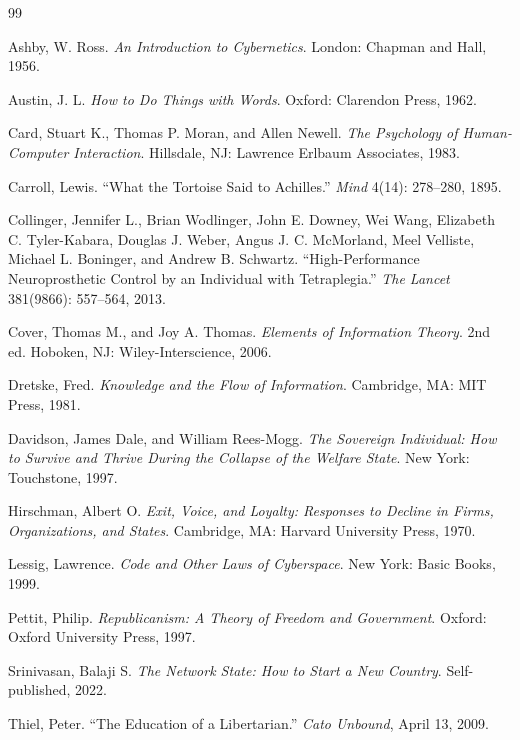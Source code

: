 \documentclass[11pt,twoside,openany]{book}
\theoremstyle{definition}
\theoremstyle{remark}
\begin{document}
\begin{thebibliography}{99}
\small

 Ashby, W. Ross. \textit{An Introduction to Cybernetics}. London: Chapman and Hall, 1956.

 Austin, J. L. \textit{How to Do Things with Words}. Oxford: Clarendon Press, 1962.

 Card, Stuart K., Thomas P. Moran, and Allen Newell. \textit{The Psychology of Human-Computer Interaction}. Hillsdale, NJ: Lawrence Erlbaum Associates, 1983.

 Carroll, Lewis. ``What the Tortoise Said to Achilles.'' \textit{Mind} 4(14): 278--280, 1895.

 Collinger, Jennifer L., Brian Wodlinger, John E. Downey, Wei Wang, Elizabeth C. Tyler-Kabara, Douglas J. Weber, Angus J. C. McMorland, Meel Velliste, Michael L. Boninger, and Andrew B. Schwartz. ``High-Performance Neuroprosthetic Control by an Individual with Tetraplegia.'' \textit{The Lancet} 381(9866): 557--564, 2013.

 Cover, Thomas M., and Joy A. Thomas. \textit{Elements of Information Theory}. 2nd ed. Hoboken, NJ: Wiley-Interscience, 2006.

 Dretske, Fred. \textit{Knowledge and the Flow of Information}. Cambridge, MA: MIT Press, 1981.

 Davidson, James Dale, and William Rees-Mogg. \textit{The Sovereign Individual: How to Survive and Thrive During the Collapse of the Welfare State}. New York: Touchstone, 1997.

 Hirschman, Albert O. \textit{Exit, Voice, and Loyalty: Responses to Decline in Firms, Organizations, and States}. Cambridge, MA: Harvard University Press, 1970.

 Lessig, Lawrence. \textit{Code and Other Laws of Cyberspace}. New York: Basic Books, 1999.

 Pettit, Philip. \textit{Republicanism: A Theory of Freedom and Government}. Oxford: Oxford University Press, 1997.

 Srinivasan, Balaji S. \textit{The Network State: How to Start a New Country}. Self-published, 2022.

 Thiel, Peter. ``The Education of a Libertarian.'' \textit{Cato Unbound}, April 13, 2009.


\end{thebibliography}
\end{document}
